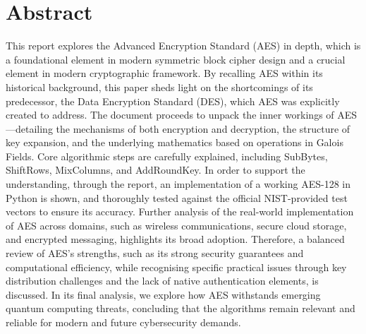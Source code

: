 \section*{Abstract} %

This report explores the Advanced Encryption Standard (AES) in depth, 
which is a foundational element in modern symmetric block cipher design and a crucial element in modern cryptographic framework. By recalling AES within its historical background, this paper sheds light on the shortcomings of its predecessor, the Data Encryption Standard (DES), which AES was explicitly created to address. 
The document proceeds to unpack the inner workings of AES—detailing the mechanisms of both encryption and decryption, 
the structure of key expansion, 
and the underlying mathematics based on operations in Galois Fields. 
Core algorithmic steps are carefully explained, 
including SubBytes, ShiftRows, MixColumns, and AddRoundKey. 
In order to support the understanding, through the report, an implementation of a working AES-128 in Python is shown, 
and thoroughly tested against the official NIST-provided test vectors to ensure its accuracy.
Further analysis of the real-world implementation of AES across domains, such as wireless communications, secure cloud storage, and encrypted messaging, highlights its broad adoption. 
Therefore, a balanced review of AES's strengths, 
such as its strong security guarantees and computational efficiency, 
while recognising specific practical issues through key distribution challenges and the lack of native authentication elements, is discussed. 
In its final analysis, we explore how AES withstands emerging quantum computing threats, 
concluding that the algorithms remain relevant and reliable for modern and future cybersecurity demands.